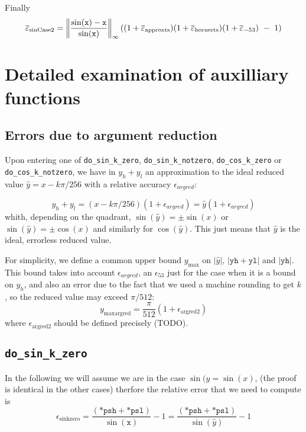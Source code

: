Finally
\begin{equation}
  \maxeps_{\mathrm{sinCase2}} =  \left\Vert\frac{\sin(\mathtt{x})-\mathtt{x}}{\sin(\mathtt{x})}\right\Vert_{\infty}((1+\maxeps_{\mathrm{approxts}})(1+\maxeps_{\mathrm{hornerts}})(1+\maxeps_{-53})\ -\ 1)
  \label{eq:SinCase2Total2}
\end{equation}
 




\section{Detailed examination of auxilliary functions}

\subsection{Errors due to argument reduction}
Upon entering one of \texttt{do\_sin\_k\_zero}, \texttt{do\_sin\_k\_notzero},
\texttt{do\_cos\_k\_zero} or \texttt{do\_cos\_k\_notzero}, we have in
$y_h+y_l$ an approximation to the ideal reduced value
$\hat{y}=x-k\pi/256$ with a relative accuracy $\epsilon_{argred}$:

\begin{equation}
  y_h+y_l = (x-k\pi/256)(1+\epsilon_{argred}) = \hat{y}(1+\epsilon_{argred})
  \label{eq:sinargrederror1}
\end{equation}
whith, depending on the quadrant, $\sin(\hat{y}) = \pm\sin(x)$ or
$\sin(\hat{y}) = \pm\cos(x)$ and similarly for $\cos(\hat{y})$. This
just means that $\hat{y}$ is the ideal, errorless reduced value.


For simplicity, we define a common upper bound $y_{\max}$ on
$|\hat{y}|$, $|\mathtt{yh}+\mathtt{yl}|$ and $|\mathtt{yh}|$. This
bound takes into account $\epsilon_{argred}$, an $\epsilon_{53}$ just
for the case when it is a bound on $y_h$, and also an error due to the
fact that we used a machine rounding to get $k$, so the reduced value
may exceed $\pi/512$:
\begin{equation}
  y_{\mathrm{maxargred}} = \frac{\pi}{512}(1+\epsilon_{\mathrm{argred2}})
  \label{eq:ymaxsink0}  
\end{equation}
where $\epsilon_{\mathrm{argred2}}$ should be defined precisely (TODO).


\subsection{\texttt{do\_sin\_k\_zero}}
In the following we will
assume we are in the case $\sin(\hat{y} = \sin(x)$, (the proof is
identical in the other cases) therfore the relative error that we need
to compute is
\begin{equation}
  \epsilon_{\mathrm{sinkzero}} = \frac{(\mathtt{*psh} + \mathtt{*psl})}{\sin(\mathtt{x})} -1 = \frac{(\mathtt{*psh} + \mathtt{*psl})}{\sin(\hat{y})} -1
\end{equation}


